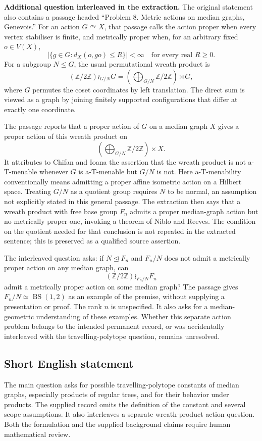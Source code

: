 \documentclass[11pt]{article}
\begin{document}
\textbf{Additional question interleaved in the extraction.} The original statement also contains a passage headed ``Problem 8. Metric actions on median graphs, Genevois.'' For an action \(G\curvearrowright X\), that passage calls the action proper when every vertex stabiliser is finite, and metrically proper when, for an arbitrary fixed \(o\in V(X)\),
\[
\bigl|\{g\in G:d_X(o,go)\le R\}\bigr|<\infty
\quad\text{for every real }R\ge0.
\]
For a subgroup \(N\le G\), the usual permutational wreath product is
\[
(\mathbb Z/2\mathbb Z)\wr_{G/N}G
=\left(\bigoplus_{G/N}\mathbb Z/2\mathbb Z\right)\rtimes G,
\]
where \(G\) permutes the coset coordinates by left translation. The direct sum is viewed as a graph by joining finitely supported configurations that differ at exactly one coordinate.

The passage reports that a proper action of \(G\) on a median graph \(X\) gives a proper action of this wreath product on
\[
\left(\bigoplus_{G/N}\mathbb Z/2\mathbb Z\right)\times X.
\]
It attributes to Chifan and Ioana the assertion that the wreath product is not a-T-menable whenever \(G\) is a-T-menable but \(G/N\) is not. Here a-T-menability conventionally means admitting a proper affine isometric action on a Hilbert space. Treating \(G/N\) as a quotient group requires \(N\) to be normal, an assumption not explicitly stated in this general passage. The extraction then says that a wreath product with free base group \(F_n\) admits a proper median-graph action but no metrically proper one, invoking a theorem of Niblo and Reeves. The condition on the quotient needed for that conclusion is not repeated in the extracted sentence; this is preserved as a qualified source assertion.

The interleaved question asks: if \(N\trianglelefteq F_n\) and \(F_n/N\) does not admit a metrically proper action on any median graph, can
\[
(\mathbb Z/2\mathbb Z)\wr_{F_n/N}F_n
\]
admit a metrically proper action on some median graph? The passage gives \(F_n/N\simeq\operatorname{BS}(1,2)\) as an example of the premise, without supplying a presentation or proof. The rank \(n\) is unspecified. It also asks for a median-geometric understanding of these examples. Whether this separate action problem belongs to the intended permanent record, or was accidentally interleaved with the travelling-polytope question, remains unresolved.
\subsection{Short English statement}
The main question asks for possible travelling-polytope constants of median graphs, especially products of regular trees, and for their behavior under products. The supplied record omits the definition of the constant and several scope assumptions. It also interleaves a separate wreath-product action question. Both the formulation and the supplied background claims require human mathematical review.
\end{document}

